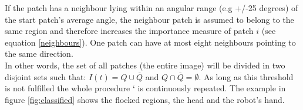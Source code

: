 If the patch has a neighbour lying within an angular range (e.g +/-25 degrees) of the start patch's average angle, the neighbour patch is assumed to belong to the same region and therefore increases the importance measure of patch $i$ (see equation \ref{neighbours}). One patch can have at most eight neighbours pointing to the same direction. \\
In other words, the set of all patches (the entire image) will be divided in two disjoint sets such that: $I \left( t\right) = Q \cup \overline{Q}$ and $Q \cap \overline{Q} = \emptyset$.
As long as this threshold is not fulfilled the whole procedure `%
 is continuously repeated. The example in figure \ref{fig:classified} shows the flocked regions, the head and the robot's hand. 
